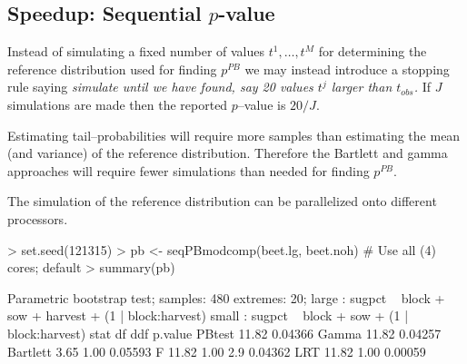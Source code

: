 


\subsection{Speedup: Sequential $p$-value}
\label{sec:seqp}


\begin{sframe}

  Instead of simulating a fixed number of values $t^1, \dots, t^M$ for
  determining the reference distribution used for finding $p^{PB}$
  we may instead introduce a stopping rule saying \emph{simulate until we
  have found, say 20 values $t^j$ larger than $t_{obs}$.} If $J$
  simulations are made then the reported $p$--value is $20/J$.

  Estimating tail--probabilities will require more samples than
  estimating the mean (and variance) of the reference
  distribution. Therefore the Bartlett and gamma approaches will
  require fewer simulations than needed for finding $p^{PB}$.

  The simulation of the reference distribution can be parallelized
  onto different processors.

  
 
  
\end{sframe}

\begin{sframe}
\begin{sblock}
\begin{Schunk}
\begin{Sinput}
> set.seed(121315)
> pb <- seqPBmodcomp(beet.lg, beet.noh) # Use all (4) cores; default
> summary(pb)
\end{Sinput}
\begin{Soutput}
Parametric bootstrap test; samples: 480 extremes: 20;
large : sugpct ~ block + sow + harvest + (1 | block:harvest)
small : sugpct ~ block + sow + (1 | block:harvest)
          stat    df ddf p.value
PBtest   11.82           0.04366
Gamma    11.82           0.04257
Bartlett  3.65  1.00     0.05593
F        11.82  1.00 2.9 0.04362
LRT      11.82  1.00     0.00059
\end{Soutput}
\end{Schunk}
\end{sblock}  
  
\end{sframe}



